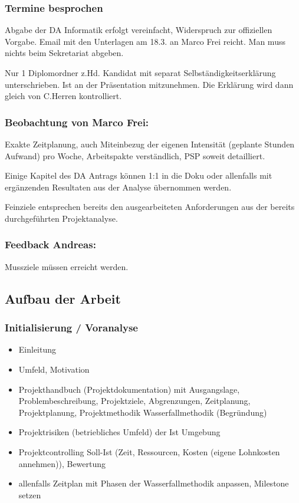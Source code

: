 \documentclass[a4paper,11pt]{article}
\begin{document}
\subsubsection*{Termine besprochen}
\label{sec:org4967130}

Abgabe der DA Informatik erfolgt vereinfacht, Widerspruch zur offiziellen
Vorgabe. Email mit den Unterlagen am 18.3. an Marco Frei reicht. Man muss
nichts beim Sekretariat abgeben.

Nur 1 Diplomordner z.Hd. Kandidat mit separat Selbständigkeitserklärung
unterschrieben. Ist an der Präsentation mitzunehmen. Die Erklärung wird dann
gleich von C.Herren kontrolliert.

\subsubsection*{Beobachtung von Marco Frei:}
\label{sec:org0b2a6f7}
Exakte Zeitplanung, auch Miteinbezug der eigenen Intensität (geplante Stunden
Aufwand) pro Woche, Arbeitspakte verständlich, PSP soweit detailliert.

Einige Kapitel des DA Antrags können 1:1 in die Doku oder allenfalls mit
ergänzenden Resultaten aus der Analyse übernommen werden.

Feinziele entsprechen bereits den ausgearbeiteten Anforderungen aus der bereits
durchgeführten Projektanalyse.

\subsubsection*{Feedback Andreas:}
\label{sec:orgced5a2b}
Mussziele müssen erreicht werden.

\subsection*{Aufbau der Arbeit}
\label{sec:org6130b96}
\subsubsection*{Initialisierung / Voranalyse}
\label{sec:orgf4cbead}

\begin{itemize}
\item Einleitung
\item Umfeld, Motivation
\item Projekthandbuch (Projektdokumentation) mit Ausgangslage, Problembeschreibung,
Projektziele, Abgrenzungen, Zeitplanung, Projektplanung, Projektmethodik
Wasserfallmethodik (Begründung)
\item Projektrisiken (betriebliches Umfeld) der Ist Umgebung
\item Projektcontrolling Soll-Ist (Zeit, Ressourcen, Kosten (eigene Lohnkosten
annehmen)), Bewertung
\item allenfalls Zeitplan mit Phasen der Wasserfallmethodik anpassen, Milestone
setzen
\end{itemize}
\end{document}
